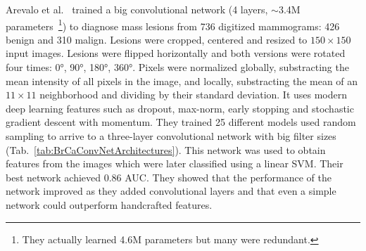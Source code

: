 \begin{comment}
- Colombia and Porto
- Benign vs. malign lesions
- Each lesion was cropped to 150x150 pixel images---bigger lesions wer reduced preserving aspect ratio.
- 8 transformations: rotations at 0, 90, 180, 270 and same rotations for flipping
- Enhancement: global contrast normalization (substract the meean of all intensities from each pixel) and local contrast normalization (each pixel is substracted the mean of a local neighborhood (11x11) and divided by the standard deviation of the neighborhood)
- They train a linear SVM with the features from the first fully connected layer of the network to perfrom the final classification.
- 1.7M paramteres(although they say they have 4.6M)
- film mammograms, not digital.
- dropout and max-norm
- early stopping
- 25 different architectures tried, and C in SVM cost also tuned
- Cons: Uses big filters and big pooling filters too because the input size (150x150) makes it unmanageable otherwise, resizes the images, uses only two convolutions (each followed by pool) plus a couple of softmaxs.
- Doesn't talk about momentum hyperparameters or learning.
- use an nvidia tesla k40(2880 cores!)
- adding more layers to the network (it is the fully convolutionla layer) improves performance
- AUC 0.86
- Maxout uses two transformations. Odd way to do maxout, i would rather use the entre 800 outputs
- bias for each unit in feature maps (3 million biases) (i can beat em)
\end{comment}
Arevalo et al.~\cite{Arevalo2015} trained a big convolutional network (4 layers, $\sim$3.4M parameters~\footnote{They actually learned 4.6M parameters but many were redundant.}) to diagnose mass lesions from 736 digitized mammograms: 426 benign and 310 malign. Lesions were cropped, centered and resized to $150\times150$ input images. Lesions were flipped horizontally and both versions were rotated four times: 0°, 90°, 180°, 360°.
Pixels were normalized globally, substracting the mean intensity of all pixels in the image, and locally, substracting the mean of an $11\times11$ neighborhood and dividing by their standard deviation. It uses modern deep learning features such as dropout, max-norm, early stopping and stochastic gradient descent with momentum. They trained 25 different models used random sampling to arrive to a three-layer convolutional network with big filter sizes (Tab.~\ref{tab:BrCaConvNetArchitectures}). This network was used to obtain features from the images which were later classified using a linear SVM. Their best network achieved 0.86 AUC. They showed that the performance of the network improved as they added convolutional layers and that even a simple network could outperform handcrafted features.


